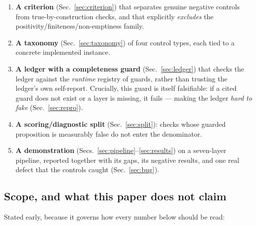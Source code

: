 \documentclass[11pt,a4paper]{article}
\begin{document}
\begin{enumerate}[leftmargin=1.4em,itemsep=2pt]
  \item \textbf{A criterion} (Sec.~\ref{sec:criterion}) that separates genuine
        negative controls from true-by-construction checks, and that explicitly
        \emph{excludes} the positivity/finiteness/non-emptiness family.
  \item \textbf{A taxonomy} (Sec.~\ref{sec:taxonomy}) of four control types, each
        tied to a concrete implemented instance.
  \item \textbf{A ledger with a completeness guard} (Sec.~\ref{sec:ledger}) that
        checks the ledger against the \emph{runtime} registry of guards, rather
        than trusting the ledger's own self-report. Crucially, this guard is
        itself falsifiable: if a cited guard does not exist or a layer is
        missing, it fails --- making the ledger \emph{hard to fake}
        (Sec.~\ref{sec:repro}).
  \item \textbf{A scoring/diagnostic split} (Sec.~\ref{sec:split}): checks whose
        guarded proposition is measurably false do not enter the denominator.
  \item \textbf{A demonstration} (Secs.~\ref{sec:pipeline}--\ref{sec:results}) on a
        seven-layer pipeline, reported together with its gaps, its negative
        results, and one real defect that the controls caught
        (Sec.~\ref{sec:bug}).
\end{enumerate}

\subsection{Scope, and what this paper does not claim}
\label{sec:nonclaims}

Stated early, because it governs how every number below should be read:
\end{document}
